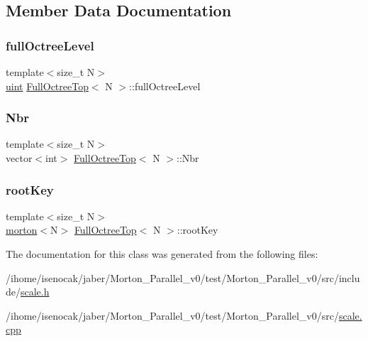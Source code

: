\subsection{Member Data Documentation}
\mbox{\label{classFullOctreeTop_a573b87dd88a6b62835e569b350daee8c}} 
\subsubsection{\texorpdfstring{full\+Octree\+Level}{fullOctreeLevel}}
{\footnotesize\ttfamily template$<$size\+\_\+t N$>$ \\
\mbox{\hyperlink{definitions_8h_a69aa29b598b851b0640aa225a9e5d61d}{uint}} \mbox{\hyperlink{classFullOctreeTop}{Full\+Octree\+Top}}$<$ N $>$\+::full\+Octree\+Level\hspace{0.3cm}{\ttfamily [private]}}

\mbox{\label{classFullOctreeTop_ac098f9373974cf7b16c2728df92633d0}} 
\subsubsection{\texorpdfstring{Nbr}{Nbr}}
{\footnotesize\ttfamily template$<$size\+\_\+t N$>$ \\
vector$<$int$>$ \mbox{\hyperlink{classFullOctreeTop}{Full\+Octree\+Top}}$<$ N $>$\+::Nbr\hspace{0.3cm}{\ttfamily [private]}}

\mbox{\label{classFullOctreeTop_a0233ce1b01dd49497f050d3aea6c8cb0}} 
\subsubsection{\texorpdfstring{root\+Key}{rootKey}}
{\footnotesize\ttfamily template$<$size\+\_\+t N$>$ \\
\mbox{\hyperlink{definitions_8h_af8682350bd8bb38ee9023f7a0a310add}{morton}}$<$N$>$ \mbox{\hyperlink{classFullOctreeTop}{Full\+Octree\+Top}}$<$ N $>$\+::root\+Key\hspace{0.3cm}{\ttfamily [private]}}



The documentation for this class was generated from the following files\+:\begin{DoxyCompactItemize}
\item 
/ihome/isenocak/jaber/\+Morton\+\_\+\+Parallel\+\_\+v0/test/\+Morton\+\_\+\+Parallel\+\_\+v0/src/include/\mbox{\hyperlink{scale_8h}{scale.\+h}}\item 
/ihome/isenocak/jaber/\+Morton\+\_\+\+Parallel\+\_\+v0/test/\+Morton\+\_\+\+Parallel\+\_\+v0/src/\mbox{\hyperlink{scale_8cpp}{scale.\+cpp}}\end{DoxyCompactItemize}
